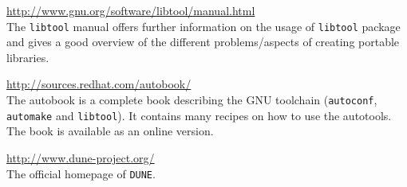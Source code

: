 \documentclass[11pt,a4paper,headinclude,footinclude,DIV16,normalheadings]{scrartcl}
\newcommand{\dune}{\texttt{DUNE}\xspace}
\newcommand{\autoconf}{\texttt{autoconf}\xspace}
\newcommand{\automake}{\texttt{automake}\xspace}
\newcommand{\libtool}{\texttt{libtool}\xspace}
\begin{document}
\url{http://www.gnu.org/software/libtool/manual.html}\\
The \libtool manual offers further information on the usage of
\libtool package and gives a good overview of the different
problems/aspects of creating portable libraries.

\url{http://sources.redhat.com/autobook/}\\
The autobook is a complete book describing the GNU toolchain
(\autoconf, \automake and \libtool). It contains many recipes on how
to use the autotools. The book is available as an online 
version.

\url{http://www.dune-project.org/}\\
The official homepage of \dune.
\end{document}
